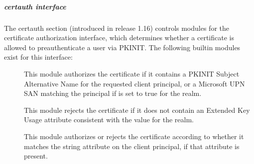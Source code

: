 \documentclass[letterpaper,10pt,english]{sphinxmanual}
\begin{document}
\subparagraph{certauth interface}
\label{\detokenize{admin/conf_files/krb5_conf:certauth-interface}}\label{\detokenize{admin/conf_files/krb5_conf:certauth}}
\sphinxAtStartPar
The certauth section (introduced in release 1.16) controls modules for
the certificate authorization interface, which determines whether a
certificate is allowed to preauthenticate a user via PKINIT.  The
following built\sphinxhyphen{}in modules exist for this interface:
\begin{description}
\item[{}] \leavevmode
\sphinxAtStartPar
This module authorizes the certificate if it contains a PKINIT
Subject Alternative Name for the requested client principal, or a
Microsoft UPN SAN matching the principal if 
is set to true for the realm.

\item[{}] \leavevmode
\sphinxAtStartPar
This module rejects the certificate if it does not contain an
Extended Key Usage attribute consistent with the
 value for the realm.

\item[{}] \leavevmode
\sphinxAtStartPar
This module authorizes or rejects the certificate according to
whether it matches the  string attribute on
the client principal, if that attribute is present.

\end{description}
\end{document}
